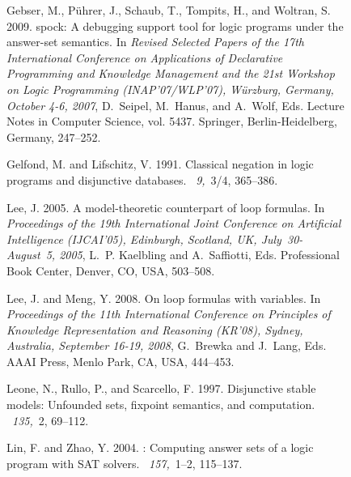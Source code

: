 \documentclass{tlp}
\begin{document}
\begin{figure}[t]
\begin{small}
\begin{thebibliography}{}
{\sc Gebser, M.}, {\sc P{\"u}hrer, J.}, {\sc Schaub, T.}, {\sc Tompits, H.},
  {\sc and} {\sc Woltran, S.} 2009.
\newblock spock: {A} debugging support tool for logic programs under the
  answer-set semantics.
\newblock In {\em Revised Selected Papers of the 17th International Conference
  on Applications of Declarative Programming and Knowledge Management and the
  21st Workshop on Logic Programming {\rm (}INAP'07/WLP'07{\rm )},
  W{\"u}rzburg, Germany, October 4-6, 2007}, {D.~Seipel}, {M.~Hanus}, {and}
  {A.~Wolf}, Eds. Lecture Notes in Computer Science, vol. 5437. Springer,
  Berlin-Heidelberg, Germany, 247--252.

{\sc Gelfond, M.} {\sc and} {\sc Lifschitz, V.} 1991.
\newblock Classical negation in logic programs and disjunctive databases.
~{\em 9,\/}~3/4, 365--386.

{\sc Lee, J.} 2005.
\newblock A model-theoretic counterpart of loop formulas.
\newblock In {\em Proceedings of the 19th International Joint Conference on
  Artificial Intelligence {\rm (}IJCAI'05{\rm )}, Edinburgh, Scotland, UK,
  July~30-August~5, 2005}, {L.~P. Kaelbling} {and} {A.~Saffiotti}, Eds.
  Professional Book Center, Denver, CO, USA, 503--508.

{\sc Lee, J.} {\sc and} {\sc Meng, Y.} 2008.
\newblock On loop formulas with variables.
\newblock In {\em Proceedings of the 11th International Conference on
  Principles of Knowledge Representation and Reasoning {\rm (}KR'08{\rm )},
  Sydney, Australia, September 16-19, 2008}, {G.~Brewka} {and} {J.~Lang}, Eds.
  AAAI Press, Menlo Park, CA, USA, 444--453.

{\sc Leone, N.}, {\sc Rullo, P.}, {\sc and} {\sc Scarcello, F.} 1997.
\newblock Disjunctive stable models: Unfounded sets, fixpoint semantics, and
  computation.
~{\em 135,\/}~2, 69--112.

{\sc Lin, F.} {\sc and} {\sc Zhao, Y.} 2004.
: Computing answer sets of a logic program with {SAT} solvers.
~{\em 157,\/}~1--2, 115--137.


\end{thebibliography}
\end{small}
\end{figure}
\end{document}
